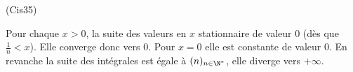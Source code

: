 \begin{tiny}(Cis35)\end{tiny}Pour chaque $x>0$, la suite des valeurs en $x$ stationnaire de valeur $0$ (dès que $\frac{1}{n} < x$). Elle converge donc vers $0$. Pour $x=0$ elle est constante de valeur $0$.\newline
En revanche la suite des intégrales est égale à $(n)_{n\in \N^*}$, elle diverge vers $+\infty$.  
